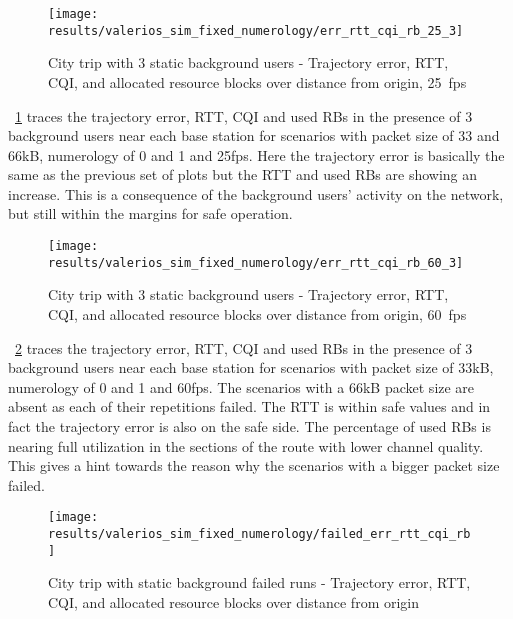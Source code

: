 \begin{figure}[H]
    \centering
    \texttt{[image: results/valerios\_sim\_fixed\_numerology/err\_rtt\_cqi\_rb\_25\_3]}
    \caption{City trip with 3 static background users - Trajectory error, RTT, CQI, and allocated resource blocks over distance from origin, 25~fps}
    \label{fig:valerios_sim_fixed_numerology_err_rtt_cqi_rb_25_3}
\end{figure}

\figurename~\ref{fig:valerios_sim_fixed_numerology_err_rtt_cqi_rb_25_3} traces the trajectory error, RTT, CQI and used RBs in the presence of 3 background users near each base station for scenarios with packet size of 33 and 66kB, numerology of 0 and 1 and 25fps. Here the trajectory error is basically the same as the previous set of plots but the RTT and used RBs are showing an increase. This is a consequence of the background users' activity on the network, but still within the margins for safe operation.

\begin{figure}[H]
    \centering
    \texttt{[image: results/valerios\_sim\_fixed\_numerology/err\_rtt\_cqi\_rb\_60\_3]}
    \caption{City trip with 3 static background users - Trajectory error, RTT, CQI, and allocated resource blocks over distance from origin, 60~fps}
    \label{fig:valerios_sim_fixed_numerology_err_rtt_cqi_rb_60_3}
\end{figure}

\figurename~\ref{fig:valerios_sim_fixed_numerology_err_rtt_cqi_rb_60_3} traces the trajectory error, RTT, CQI and used RBs in the presence of 3 background users near each base station for scenarios with packet size of 33kB, numerology of 0 and 1 and 60fps. The scenarios with a 66kB packet size are absent as each of their repetitions failed. The RTT is within safe values and in fact the trajectory error is also on the safe side. The percentage of used RBs is nearing full utilization in the sections of the route with lower channel quality. This gives a hint towards the reason why the scenarios with a bigger packet size failed.

\begin{figure}[H]
    \centering
    \texttt{[image: results/valerios\_sim\_fixed\_numerology/failed\_err\_rtt\_cqi\_rb]}
    \caption{City trip with static background failed runs - Trajectory error, RTT, CQI, and allocated resource blocks over distance from origin}
    \label{fig:valerios_sim_fixed_numerology_failed_err_rtt_cqi_rb_60_3}
\end{figure}


